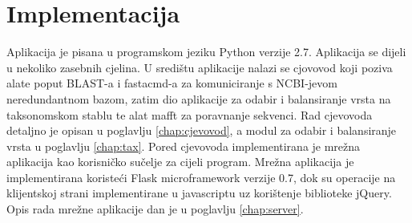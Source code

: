 \chapter{Implementacija}
\label{chap:implementacija}


Aplikacija je pisana u programskom jeziku Python verzije 2.7. Aplikacija se
dijeli u nekoliko zasebnih cjelina. U središtu aplikacije nalazi se cjovovod
koji poziva alate poput BLAST-a \cite{altschul1997gapped} i fastacmd-a za
komuniciranje s NCBI-jevom neredundantnom bazom, zatim dio aplikacije za
odabir i balansiranje vrsta na taksonomskom stablu te alat mafft \cite{mafft} za
poravnanje sekvenci. Rad cjevovoda detaljno je opisan u poglavlju
\ref{chap:cjevovod}, a modul za odabir i balansiranje vrsta u poglavlju
\ref{chap:tax}. Pored cjevovoda implementirana je mrežna aplikacija kao
korisničko sučelje za cijeli program. Mrežna aplikacija je implementirana
koristeći Flask microframework verzije 0.7, dok su operacije na klijentskoj
strani implementirane u javascriptu uz korištenje biblioteke jQuery. Opis rada
mrežne aplikacije dan je u poglavlju \ref{chap:server}.


